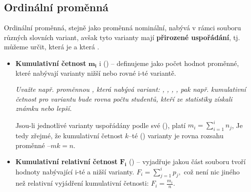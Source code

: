 \subsection{Ordinální proměnná}
Ordinální proměnná, stejně jako proměnná nominální, nabývá v rámci souboru různých slovních variant, avšak tyto varianty mají \textbf{přirozené uspořádání}, tj. můžeme určit, která je  a která .
\begin{itemize}
    \item \textbf{Kumulativní četnost} $\mathbf{m_i}$ i () -- definujeme jako počet hodnot proměnné, které nabývají varianty nižší nebo rovné i-té variantě.

          \textit{Uvažte např. proměnnou , která nabývá variant: , , , , pak např. kumulativní četnost pro variantu  bude rovna počtu studentů, kteří ze statistiky získali známku  nebo lepší.}

          Jsou-li jednotlivé varianty uspořádány podle své (), platí $m_i = \sum\limits_{i=1}^i n_j$, Je tedy zřejmé, že kumulativní četnost $k$--té () varianty je rovna rozsahu proměnné $– mk = n$.

    \item \textbf{Kumulativní relativní četnost} $\mathbf{F_i}$ () -- vyjadřuje jakou část souboru tvoří hodnoty nabývající i-té a nižší varianty. $F_i = \sum\limits_{j=1}^i p_j,$ což není nic jiného než relativní vyjádření kumulativní četnosti: $F_i = \frac{m_i}{n}$.


\end{itemize}
